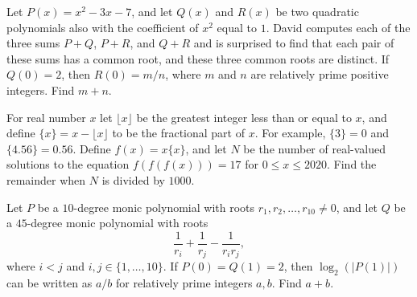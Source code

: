 \begin{question}[name={2020 AIME II, \href{https://artofproblemsolving.com/community/c4p15681035}{Problem 11}}]
	Let $P(x) = x^2 - 3x - 7$, and let $Q(x)$ and $R(x)$ be two quadratic polynomials also with the coefficient of $x^2$ equal to $1$. David computes each of the three sums $P + Q$, $P + R$, and $Q + R$ and is surprised to find that each pair of these sums has a common root, and these three common roots are distinct. If $Q(0) = 2$, then $R(0) = m/n$, where $m$ and $n$ are relatively prime positive integers. Find $m+n$.
\end{question}


%	











\begin{question}[name={2020 AIME II, \href{https://artofproblemsolving.com/community/c4p15680959}{Problem 14}}]
	For real number $x$ let $\lfloor x\rfloor$ be the greatest integer less than or equal to $x$, and define $\{x\}=x-\lfloor x\rfloor$ to be the fractional part of $x$. For example, $\{3\}=0$ and $\{4.56\}=0.56$. Define $f(x)=x\{x\}$, and let $N$ be the number of real-valued solutions to the equation $f(f(f(x)))=17$ for $0\leq x\leq 2020$. Find the remainder when $N$ is divided by $1000$.
\end{question}


%	



\begin{question}[name={2020 PUMaC, Algebra, \href{https://artofproblemsolving.com/community/c4p23985023}{Problem A4/B6}}]
	Let $P$ be a $10$-degree monic polynomial with roots $r_1, r_2, \dots , r_{10} \neq 0$, and let $Q$ be a $45$-degree monic polynomial with roots $$\frac{1}{r_i}+\frac{1}{r_j}-\frac{1}{r_ir_j},$$ where $i < j$ and $i, j \in \{1, \dots , 10\}$. If $P(0) = Q(1) = 2$, then $\log_2 (|P(1)|)$ can be written as $a/b$ for relatively prime integers $a, b$. Find $a + b$.	
\end{question}


%	




